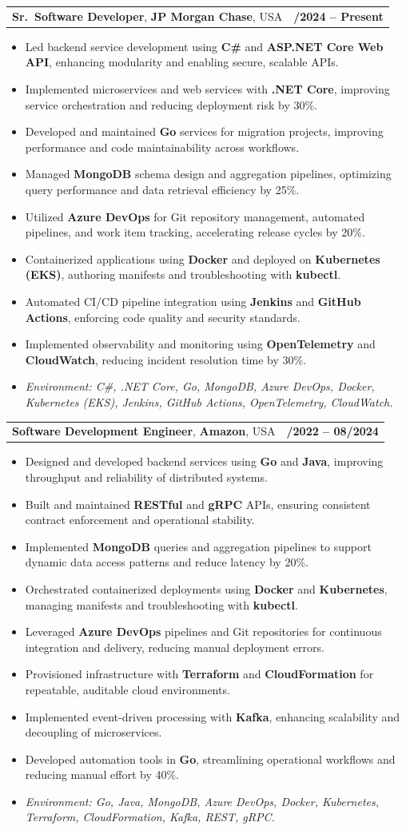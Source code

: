 \documentclass[letterpaper,11pt]{article}
\makeatletter
\newcommand{\resumeItem}[1]{
  \item\footnotesize{
    {#1 \vspace{-2pt}}
  }
}
\newcommand{\resumeSubheading}[4]{
  \vspace{-2pt}\item
    \begin{tabular*}{1.0\textwidth}[t]{l@{\extracolsep{\fill}}r}
      \textbf{\fontsize{10pt}{14pt}\selectfont #3}, \textbf{\fontsize{10pt}{14pt}\selectfont #1}, \fontsize{10pt}{14pt}\selectfont #4 & \textbf{\fontsize{10pt}{14pt}\selectfont #2} \\
    \end{tabular*}\vspace{-7pt}
}
\newcommand{\resumeItemListStart}{\begin{itemize}[leftmargin=*]}
\newcommand{\resumeItemListEnd}{\end{itemize}\vspace{-5pt}}
\makeatother
\begin{document}
\resumeSubheading
{JP Morgan Chase}{09/2024 -- Present}
{Sr.\ Software Developer}{USA}
\resumeItemListStart
  \resumeItem{Led backend service development using \textbf{C\#} and \textbf{ASP.NET Core Web API}, enhancing modularity and enabling secure, scalable APIs.}
  \resumeItem{Implemented microservices and web services with \textbf{.NET Core}, improving service orchestration and reducing deployment risk by 30\%.}
  \resumeItem{Developed and maintained \textbf{Go} services for migration projects, improving performance and code maintainability across workflows.}
  \resumeItem{Managed \textbf{MongoDB} schema design and aggregation pipelines, optimizing query performance and data retrieval efficiency by 25\%.}
  \resumeItem{Utilized \textbf{Azure DevOps} for Git repository management, automated pipelines, and work item tracking, accelerating release cycles by 20\%.}
  \resumeItem{Containerized applications using \textbf{Docker} and deployed on \textbf{Kubernetes (EKS)}, authoring manifests and troubleshooting with \textbf{kubectl}.}
  \resumeItem{Automated CI/CD pipeline integration using \textbf{Jenkins} and \textbf{GitHub Actions}, enforcing code quality and security standards.}
  \resumeItem{Implemented observability and monitoring using \textbf{OpenTelemetry} and \textbf{CloudWatch}, reducing incident resolution time by 30\%.}
  \resumeItem{\textit{Environment: C\#, .NET Core, Go, MongoDB, Azure DevOps, Docker, Kubernetes (EKS), Jenkins, GitHub Actions, OpenTelemetry, CloudWatch.}}
\resumeItemListEnd

\resumeSubheading
{Amazon}{10/2022 -- 08/2024}
{Software Development Engineer}{USA}
\resumeItemListStart
  \resumeItem{Designed and developed backend services using \textbf{Go} and \textbf{Java}, improving throughput and reliability of distributed systems.}
  \resumeItem{Built and maintained \textbf{RESTful} and \textbf{gRPC} APIs, ensuring consistent contract enforcement and operational stability.}
  \resumeItem{Implemented \textbf{MongoDB} queries and aggregation pipelines to support dynamic data access patterns and reduce latency by 20\%.}
  \resumeItem{Orchestrated containerized deployments using \textbf{Docker} and \textbf{Kubernetes}, managing manifests and troubleshooting with \textbf{kubectl}.}
  \resumeItem{Leveraged \textbf{Azure DevOps} pipelines and Git repositories for continuous integration and delivery, reducing manual deployment errors.}
  \resumeItem{Provisioned infrastructure with \textbf{Terraform} and \textbf{CloudFormation} for repeatable, auditable cloud environments.}
  \resumeItem{Implemented event-driven processing with \textbf{Kafka}, enhancing scalability and decoupling of microservices.}
  \resumeItem{Developed automation tools in \textbf{Go}, streamlining operational workflows and reducing manual effort by 40\%.}
  \resumeItem{\textit{Environment: Go, Java, MongoDB, Azure DevOps, Docker, Kubernetes, Terraform, CloudFormation, Kafka, REST, gRPC.}}
\resumeItemListEnd
\end{document}
